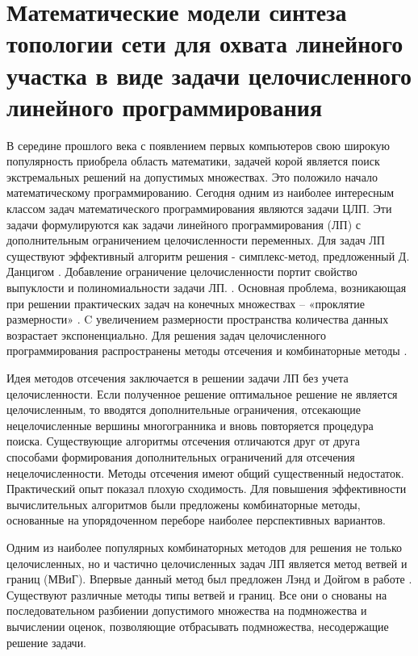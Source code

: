 \section{Математические модели синтеза топологии сети для охвата линейного участка в виде задачи целочисленного линейного программирования}

В середине прошлого века с появлением первых компьютеров свою широкую популярность приобрела область математики, задачей корой является поиск экстремальных решений на допустимых множествах. Это положило начало математическому программированию. Сегодня одним из наиболее интересным классом задач математического программирования являются задачи ЦЛП. Эти задачи формулируются как задачи линейного программирования (ЛП) с дополнительным ограничением целочисленности переменных. Для задач ЛП существуют эффективный алгоритм решения - симплекс-метод, предложенный Д. Данцигом \cite{Dantzig1963}. Добавление ограничение целочисленности портит свойство выпуклости и полиномиальности задачи ЛП. \fixme{[Ссылка]}. Основная проблема, возникающая при решении практических задач на конечных множествах --  «проклятие размерности» \cite{Pershin2013}. C увеличением размерности пространства количества данных возрастает экспоненциально. Для решения задач целочисленного программирования распространены методы отсечения и комбинаторные методы \cite{Alekseev1987, Sukharev1986}. 

Идея методов отсечения заключается в решении задачи ЛП без учета целочисленности. Если полученное решение оптимальное решение не является целочисленным, то вводятся дополнительные ограничения, отсекающие нецелочисленные вершины многогранника и вновь повторяется процедура поиска. Существующие алгоритмы отсечения отличаются друг от друга способами формирования дополнительных ограничений для отсечения нецелочисленности. Методы отсечения имеют общий существенный недостаток. Практический опыт показал плохую сходимость. Для повышения эффективности вычислительных алгоритмов были предложены комбинаторные методы, основанные на упорядоченном переборе наиболее перспективных вариантов. 


Одним из наиболее популярных комбинаторных методов для решения не только целочисленных, но и частично целочисленных задач ЛП является метод ветвей и границ (МВиГ). Впервые данный метод  был предложен Лэнд и Дойгом в работе \cite{Land1960}. Существуют различные методы типы ветвей и границ. Все они о снованы на последовательном разбиении допустимого множества на подмножества и вычислении оценок, позволяющие отбрасывать подмножества, несодержащие решение задачи.

